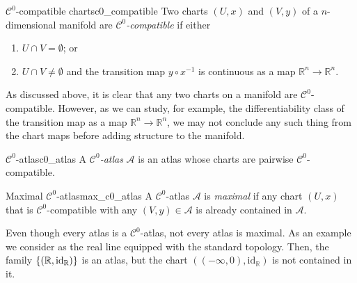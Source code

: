 \begin{definition}{\(\mathcal{C}^0\)-compatible charts}{c0_compatible}
    Two charts \((U, x)\) and \((V, y)\) of a \(n\)-dimensional manifold  are \emph{\(\mathcal{C}^0\)-compatible} if either
    \begin{enumerate}[label=(\alph*)]
        \item \(U \cap V = \emptyset\); or
        \item \(U \cap V \neq \emptyset\) and the transition map \(y \circ x^{-1}\) is continuous as a map \(\mathbb{R}^n \to \mathbb{R}^n\).
    \end{enumerate}
\end{definition}

As discussed above, it is clear that any two charts on a manifold are \(\mathcal{C}^0\)-compatible. However, as we can study, for example, the differentiability class of the transition map as a map \(\mathbb{R}^n \to \mathbb{R}^n\), we may not conclude any such thing from the chart maps before adding structure to the manifold.

\begin{definition}{\(\mathcal{C}^0\)-atlas}{c0_atlas}
    A \emph{\(\mathcal{C}^0\)-atlas} \(\mathscr{A}\) is an atlas whose charts are pairwise \(\mathcal{C}^0\)-compatible.
\end{definition}

\begin{definition}{Maximal \(\mathcal{C}^0\)-atlas}{max_c0_atlas}
    A \(\mathcal{C}^0\)-atlas \(\mathscr{A}\) is \emph{maximal} if any chart \((U, x)\) that is \(\mathcal{C}^0\)-compatible with any \((V, y) \in \mathscr{A}\) is already contained in \(\mathscr{A}\).
\end{definition}

Even though every atlas is a \(\mathcal{C}^0\)-atlas, not every atlas is maximal. As an example we consider  as the real line equipped with the standard topology. Then, the family \(\{(\mathbb{R}, \mathrm{id}_{\mathbb{R}})\}\) is an atlas, but the chart \(((-\infty, 0), \mathrm{id}_{\mathbb{R}})\) is not contained in it.

